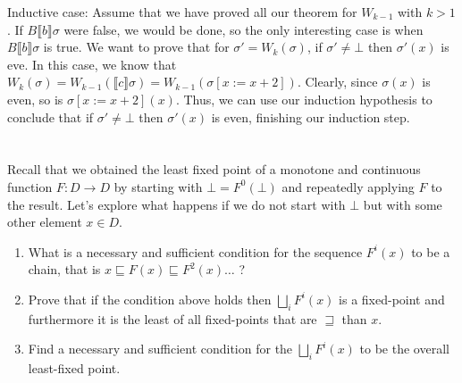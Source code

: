 \documentclass{article}
\newcommand{\problem}[1]
{\subsubsection*{} %
\vspace{-16pt} \section{} \vspace{-22pt} \qquad
#1%
\bigskip \bigskip
}
\newcommand{\denote}[1]{\llbracket #1 \rrbracket}
\begin{document}
Inductive case:
Assume that we have proved all our theorem for $W_{k-1}$ with $k > 1$.  If
$B\denote{b}\sigma$ were false, we would be done, so the only interesting case
is when $B\denote{b}\sigma$ is true.
We want to prove that for $\sigma' = W_k(\sigma)$, if $\sigma' \ne
\bot$ then $\sigma'(x)$ is eve. In this case, we know that $W_k(\sigma) =
W_{k-1}(\denote{c}\sigma) = W_{k-1}(\sigma[x := x + 2])$.
Clearly, since $\sigma(x)$ is even, so is $\sigma[x := x + 2](x)$.
Thus, we can use our induction hypothesis to conclude that if $\sigma' \ne \bot$
then $\sigma'(x)$ is even, finishing our induction step.

\problem{
Recall that we obtained the least fixed point of a monotone
and continuous function $F : D \to D$ by starting with $\bot = F^0(\bot)$ and
repeatedly applying $F$ to the result. Let's explore what happens if we do not
start with $\bot$ but with some other element $x \in D$.
\begin{enumerate}
  \item What is a necessary and sufficient condition for the sequence $F^i(x)$
  to be a chain, that is $x \sqsubseteq F(x) \sqsubseteq F^2 (x) \ldots$ ?

  \item Prove that if the condition above holds then $\bigsqcup_i F^i (x)$ is a
  fixed-point and furthermore it is the least of all fixed-points that are
  $\sqsupseteq$ than $x$.

  \item Find a necessary and sufficient condition for the $\bigsqcup_i F^i (x)$ to be
the overall least-fixed point.
\end{enumerate}
}
\end{document}
